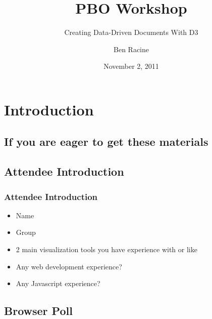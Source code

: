 \documentclass{beamer}
\title{PBO Workshop}
\subtitle{Creating Data-Driven Documents With D3}
\author{Ben Racine \inst{1} }
\institute{\inst{1} Cornerstone Systems NW }
\date{November 2, 2011}
\begin{document}
\begin{frame}
    \frametitle{}
    \titlepage
\end{frame}






\section{Introduction}


\subsection{If you are eager to get these materials}




\subsection{Attendee Introduction}


\begin{frame}
    \frametitle{Attendee Introduction}
    \begin{itemize}
\pause
    \item Name
    \item Group
    \item 2 main visualization tools you have experience with or like
    \item Any web development experience?
    \item Any Javascript experience?
    \end{itemize}
\end{frame}


\subsection{Browser Poll}
\end{document}
